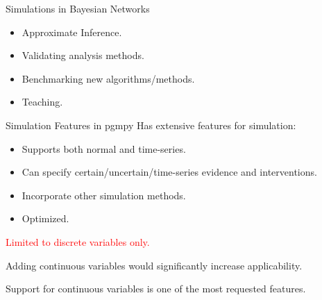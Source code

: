 \documentclass{beamer}
\begin{document}
\begin{frame}{Simulations in Bayesian Networks}
	\begin{itemize}
		\item Approximate Inference.
		\item Validating analysis methods.
		\item Benchmarking new algorithms/methods.
		\item Teaching.
	\end{itemize}
\end{frame}

\begin{frame}{Simulation Features in pgmpy}
	Has extensive features for simulation:
	\begin{itemize}
		\item Supports both normal and time-series.
		\item Can specify certain/uncertain/time-series evidence and interventions.
		\item Incorporate other simulation methods.
		\item Optimized.
	\end{itemize}


	\vspace{4em}
	\centerline{\textcolor{red}{Limited to discrete variables only.}}
	\centerline{Adding continuous variables would significantly increase applicability.}
	\centerline{Support for continuous variables is one of the most requested features.}



\end{frame}
\end{document}
